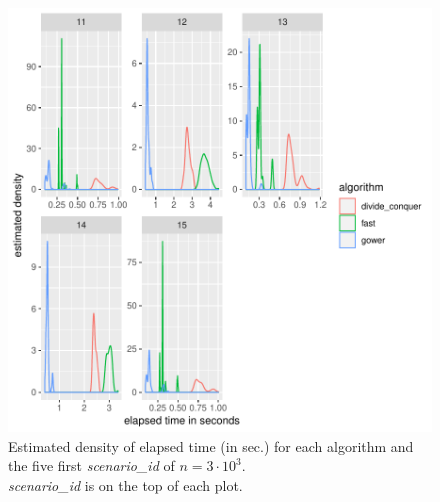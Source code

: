\documentclass[11pt]{report}
\begin{document}
\begin{figure}[h]
\centering
    \includegraphics[scale=1]{./images/elapsed_time_3000_part1.pdf}
    \caption{
    Estimated density of elapsed time (in sec.) for each algorithm and the five 
    first \textit{scenario\_id} of $n=3 \cdot 10^3$.\\
    \textit{scenario\_id} is on the top of each plot.
    }
\end{figure}

\FloatBarrier
\end{document}
